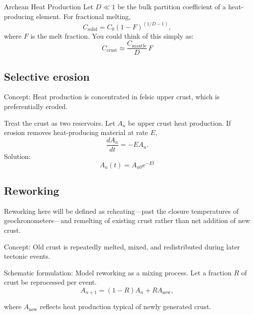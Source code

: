 \begin{activity}{Archean Heat Production}
Let $D \ll 1$ be the bulk partition coefficient of a heat-producing element.
For fractional melting,
\[
C_{\text{solid}} = C_0 (1 - F)^{(1/D - 1)},
\]
where $F$ is the melt fraction.  You could think of this simply as:
\[
C_{\text{crust}} \approx \frac{C_{\text{mantle}}}{D} \, F
\]



\subsection*{Selective erosion}
Concept: Heat production is concentrated in felsic upper crust, which is preferentially eroded.

Treat the crust as two reservoirs.  Let $A_u$ be upper crust heat production.  If erosion removes heat-producing material at rate $E$,
\[
\frac{dA_u}{dt} = -E A_u.
\]
Solution:
\[
A_u(t) = A_{u0} e^{-Et}
\]



\subsection*{Reworking}
Reworking here will be defined as reheating---past the closure temperatures of geochronometers---and remelting of existing crust rather than net addition of new crust.

Concept: Old crust is repeatedly melted, mixed, and redistributed during later tectonic events.

Schematic formulation: Model reworking as a mixing process.  Let a fraction $R$ of crust be reprocessed per event.
\[
A_{n+1} = (1 - R) A_n + R A_{\text{new}},
\]

where \(A_{\text{new}}\) reflects heat production typical of newly generated crust.




\end{activity}
